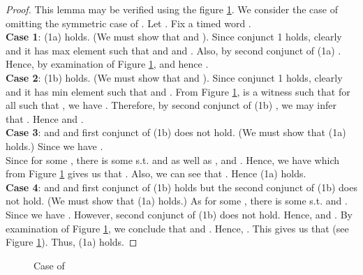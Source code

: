 \documentclass{llncs}
\begin{document}
\begin{proof}
This lemma may be verified using the figure \ref{fig:bmitlpo2fig1}. We consider the case of  omitting the symmetric case of . Let .
Fix a timed word .\\
\textbf{Case 1}:  (1a) holds. (We must show that  and ). Since conjunct 1 holds, clearly  and it has max element  such that  and  and . Also, by second conjunct of (1a) . Hence, by examination of Figure \ref{fig:bmitlpo2fig1},   and hence . \\
\textbf{Case 2}:  (1b) holds. (We must show that  and ). Since conjunct 1 holds, clearly  and it has min element  such that  and . From Figure \ref{fig:bmitlpo2fig1},  is a witness such that for all  such that , we have . Therefore, by second conjunct of (1b) , we may infer that . Hence  and .\\
\textbf{Case 3}:  and  and  first conjunct of (1b) does not hold. (We must show that (1a) holds.) Since  we have . \\
Since  for some , there is some  s.t.  and  as well as , and 
. Hence, we have  which from Figure
\ref{fig:bmitlpo2fig1} gives us that . Also, we can see that . Hence (1a) holds.\\
\textbf{Case 4}:  and  and first conjunct of (1b) holds but the second conjunct of (1b) does not hold. (We must show that (1a) holds.)
As  for some , there is some  s.t.  and . \\
Since  we have
. However, second conjunct of
(1b) does not hold. Hence,  and .
By examination of Figure \ref{fig:bmitlpo2fig1}, we conclude that 
 and . Hence, .
 This gives us that
 (see Figure \ref{fig:bmitlpo2fig1}).
Thus, (1a) holds.
\end{proof}


\begin{figure}
\caption{Case of }
\label{fig:bmitlpo2fig1}
\end{figure}
\end{document}
